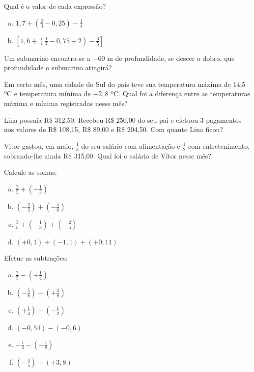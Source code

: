 \item Qual é o valor de cada expressão?
\begin{multicols}{2}
\begin{enumerate}[a)]
	\item $1,7+\left(\displaystyle\frac{2}{3}-0,25\right) - \displaystyle\frac{1}{4}$
	\item $\left[1,6+\left(\displaystyle\frac{1}{4}-0,75+2 \right)-\displaystyle\frac{3}{5}\right]$
\end{enumerate}
\end{multicols}

\item Um submarino encontra-se a $-60$ m de profundidade, se descer o dobro, que profundidade o submarino atingirá?

\item Em certo mês, uma cidade do Sul do país teve sua temperatura máxima de 14,5 ºC e temperatura mínima de $-2,8$ ºC. Qual foi a diferença entre as temperaturas máxima e mínima registradas nesse mês?

\item Lina possuía R\$ 312,50. Recebeu R\$ 250,00 do seu pai e efetuou 3 pagamentos nos valores de R\$ 108,15, R\$ 89,00 e R\$ 204,50. Com quanto Lina ficou?

\item Vitor gastou, em maio, $\frac{1}{3}$ do seu salário com alimentação e $\frac{1}{2}$ com entretenimento, sobrando-lhe ainda R\$ 315,00. Qual foi o salário de Vítor nesse mês?

\item Calcule as somas:
\begin{multicols}{2}
\begin{enumerate}[a)]
	\item $\displaystyle\frac{2}{5}+\left(-\frac{1}{3}\right)$
	\item $\displaystyle\left(-\frac{2}{3}\right)+\left(-\frac{5}{6}\right)$
	\item $\displaystyle\frac{3}{5}+ \left(-\frac{1}{3}\right)+\left(-\frac{2}{5}\right)$
	\item $(+0,1)+(-1,1)+(+0,11)$
\end{enumerate}
\end{multicols}

\item Efetue as subtrações:
\begin{multicols}{2}
\begin{enumerate}[a)]
	\item $\displaystyle\frac{2}{5}-\left(+\frac{1}{4}\right)$
	\item $\displaystyle\left(-\frac{5}{8}\right)-\left(+\frac{3}{8}\right)$
	\item $\displaystyle\left(+\frac{1}{4}\right)-\left(-\frac{1}{2}\right)$
	\item $(-0,54)-(-0,6)$
	\item $-\displaystyle\frac{1}{4}-\left(-\frac{1}{8}\right)$
	\item $\displaystyle\left(-\frac{4}{5}\right)-(+3,8)$
\end{enumerate}
\end{multicols}

